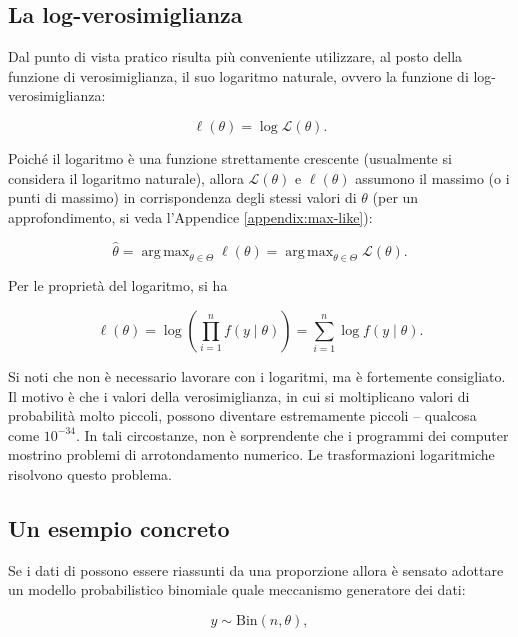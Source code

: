 \documentclass[
  11pt,
]{krantz}
\DeclareMathOperator{\argmax}{arg\,max}
\theoremstyle{definition}
\theoremstyle{definition}
\theoremstyle{definition}
\theoremstyle{definition}
\theoremstyle{remark}
\begin{document}
\hypertarget{la-log-verosimiglianza}{%
\subsection{La log-verosimiglianza}\label{la-log-verosimiglianza}}

Dal punto di vista pratico risulta più conveniente utilizzare, al posto della funzione di verosimiglianza, il suo logaritmo naturale, ovvero la funzione di log-verosimiglianza:

\begin{equation}
\ell(\theta) = \log \mathcal{L}(\theta).
\end{equation}

Poiché il logaritmo è una funzione strettamente crescente (usualmente si considera il logaritmo naturale), allora \(\mathcal{L}(\theta)\) e \(\ell(\theta)\) assumono il massimo (o i punti di massimo) in corrispondenza degli stessi valori di \(\theta\) (per un approfondimento, si veda l'Appendice \ref{appendix:max-like}):

\[
\hat{\theta} = \argmax_{\theta \in \Theta} \ell(\theta) = \argmax_{\theta \in \Theta} \mathcal{L}(\theta).
\]

Per le proprietà del logaritmo, si ha

\begin{equation}
\ell(\theta) = \log \left( \prod_{i = 1}^n f(y \mid \theta) \right) = \sum_{i = 1}^n \log f(y \mid \theta).
\end{equation}

Si noti che non è necessario lavorare con i logaritmi, ma è fortemente consigliato. Il motivo è che i valori della verosimiglianza, in cui si moltiplicano valori di probabilità molto piccoli, possono diventare estremamente piccoli -- qualcosa come \(10^{-34}\). In tali circostanze, non è sorprendente che i programmi dei computer mostrino problemi di arrotondamento numerico. Le trasformazioni logaritmiche risolvono questo problema.

\hypertarget{un-esempio-concreto-1}{%
\subsection{Un esempio concreto}\label{un-esempio-concreto-1}}

Se i dati di \citet{zetschefuture2019} possono essere riassunti da una proporzione allora è sensato adottare un modello probabilistico binomiale quale meccanismo generatore dei dati:

\begin{equation}
y  \sim \mbox{Bin}(n, \theta),
\label{eq:binomialmodel}
\end{equation}
\end{document}
